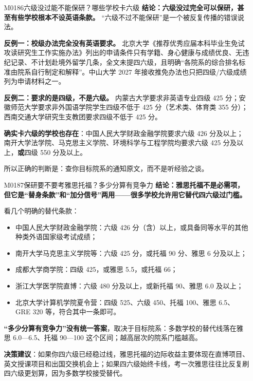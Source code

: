 \begin{qa}{M0186}{六级没过能不能保研？哪些学校卡六级}
\textbf{结论：六级没过完全可以保研，甚至有些学校根本不设英语条款。} “六级不过不能保研”是一个被反复传播的错误说法。

\textbf{反例一：校级办法完全没有英语要求。} 北京大学《推荐优秀应届本科毕业生免试攻读研究生工作实施办法》列出的申请条件只有学籍、身心健康与成绩优良、无违纪记录、不计划赴境外留学几条，全文未提四六级，且明确“各院系的综合排名标准由院系自行制定和解释”。中山大学 2027 年接收推免办法也只把四级/六级成绩列为申请材料之一。

\textbf{反例二：要求的是四级，不是六级。} 内蒙古大学要求非英语专业四级 425 分；安徽师范大学要求非外国语学院学生四级不低于 425 分（艺术类、体育类 355 分）；西南交通大学研究生支教团要求四级不低于 425 分。

\textbf{确实卡六级的学校也存在}：中国人民大学财政金融学院要求六级 426 分及以上；南开大学法学院、马克思主义学院、环境科学与工程学院均要求六级 425 分及以上，\textbf{或}四级 550 分及以上。

所以正确的判断是：查你目标院系的通知原文，而不是听经验之谈。
\end{qa}

\begin{qa}{M0187}{保研要不要考雅思托福？多少分算有竞争力}
\textbf{结论：雅思托福不是必需项，但它是“替身条款”和“加分信号”两用——很多学校允许用它替代四六级过门槛。}

看几个明确的替代条款：
\begin{itemize}
  \item 中国人民大学财政金融学院：六级 426 分（含）以上，或具备同等水平的其他种类外语国家级考试成绩；
  \item 南开大学马克思主义学院等：六级 425 分，或托福 90 分、雅思 6 分及以上；
  \item 成都大学商学院：四级 425，或雅思 5.5，或托福 66；
  \item 浙江大学医学院直博：六级 480 分及以上，或新托福 90、雅思 6.0 及以上；
  \item 北京大学计算机学院夏令营：四级 525、六级 450、托福 100、雅思 6.5、GRE 320 等，符合其中一条即可。
\end{itemize}

\textbf{“多少分算有竞争力”没有统一答案}，取决于目标院系：多数学校的替代线落在雅思 6.0—6.5、托福 90—100 这个区间；越高层次的院系门槛越高。

\textbf{决策建议}：如果你四六级已经稳过线，雅思托福的边际收益主要体现在直博项目、英文授课项目和出国交换机会上；如果四六级始终卡线，考一次雅思往往比反复刷四六级更划算，因为多数学校接受替代。
\end{qa}

